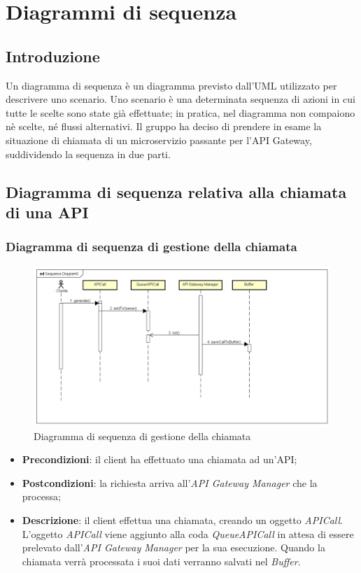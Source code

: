 \newpage
\section{Diagrammi di sequenza}
\subsection{Introduzione}
Un diagramma di sequenza è un diagramma previsto dall'UML utilizzato per descrivere uno scenario.
Uno scenario è una determinata sequenza di azioni in cui tutte le scelte sono state già effettuate; in pratica, nel diagramma non compaiono nè scelte, né flussi alternativi.
Il gruppo ha deciso di prendere in esame la situazione di chiamata di un microservizio passante per l'API Gateway, suddividendo la sequenza in due parti.

\subsection{Diagramma di sequenza relativa alla chiamata di una API}
\subsubsection{Diagramma di sequenza di gestione della chiamata}
\begin{figure}[h]
	\centering
	\includegraphics[width=1.0\linewidth]{"IMG/Sequence Diagram0"}
	\caption{Diagramma di sequenza di gestione della chiamata}
\end{figure}

\begin{itemize}
	\item \textbf{Precondizioni}: il client ha effettuato una chiamata ad un'API;
	\item \textbf{Postcondizioni}: la richiesta arriva all'\textit{API Gateway Manager} che la processa;
	\item \textbf{Descrizione}: il client effettua una chiamata, creando un oggetto \textit{APICall}. L'oggetto \textit{APICall} viene aggiunto alla coda \textit{QueueAPICall} in attesa di essere prelevato dall'\textit{API Gateway Manager} per la sua esecuzione. Quando la chiamata verrà processata i suoi dati verranno salvati nel \textit{Buffer}.
\end{itemize}

